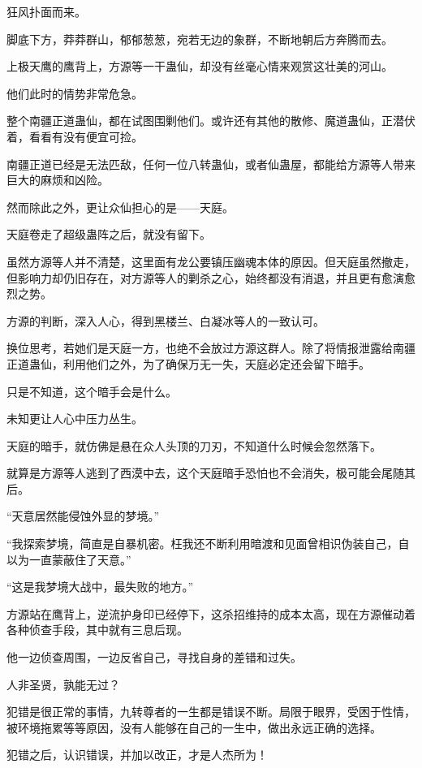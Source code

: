 
\begin{this_body}

狂风扑面而来。

脚底下方，莽莽群山，郁郁葱葱，宛若无边的象群，不断地朝后方奔腾而去。

上极天鹰的鹰背上，方源等一干蛊仙，却没有丝毫心情来观赏这壮美的河山。

他们此时的情势非常危急。

整个南疆正道蛊仙，都在试图围剿他们。或许还有其他的散修、魔道蛊仙，正潜伏着，看看有没有便宜可捡。

南疆正道已经是无法匹敌，任何一位八转蛊仙，或者仙蛊屋，都能给方源等人带来巨大的麻烦和凶险。

然而除此之外，更让众仙担心的是——天庭。

天庭卷走了超级蛊阵之后，就没有留下。

虽然方源等人并不清楚，这里面有龙公要镇压幽魂本体的原因。但天庭虽然撤走，但影响力却仍旧存在，对方源等人的剿杀之心，始终都没有消退，并且更有愈演愈烈之势。

方源的判断，深入人心，得到黑楼兰、白凝冰等人的一致认可。

换位思考，若她们是天庭一方，也绝不会放过方源这群人。除了将情报泄露给南疆正道蛊仙，利用他们之外，为了确保万无一失，天庭必定还会留下暗手。

只是不知道，这个暗手会是什么。

未知更让人心中压力丛生。

天庭的暗手，就仿佛是悬在众人头顶的刀刃，不知道什么时候会忽然落下。

就算是方源等人逃到了西漠中去，这个天庭暗手恐怕也不会消失，极可能会尾随其后。

“天意居然能侵蚀外显的梦境。”

“我探索梦境，简直是自暴机密。枉我还不断利用暗渡和见面曾相识伪装自己，自以为一直蒙蔽住了天意。”

“这是我梦境大战中，最失败的地方。”

方源站在鹰背上，逆流护身印已经停下，这杀招维持的成本太高，现在方源催动着各种侦查手段，其中就有三息后现。

他一边侦查周围，一边反省自己，寻找自身的差错和过失。

人非圣贤，孰能无过？

犯错是很正常的事情，九转尊者的一生都是错误不断。局限于眼界，受困于性情，被环境拖累等等原因，没有人能够在自己的一生中，做出永远正确的选择。

犯错之后，认识错误，并加以改正，才是人杰所为！


\end{this_body}
